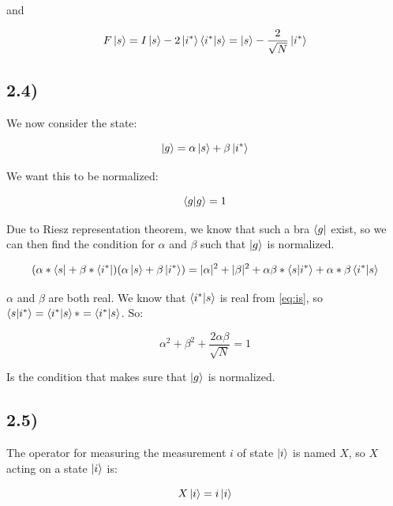 \documentclass[a4paper,norsk, 10pt]{article}
\begin{document}
and

\begin{equation}
F\ket{s} = I\ket{s} - 2\ket{i^*}\bra{i^*}\ket{s} = \ket{s} - \frac{2}{\sqrt{N}}\ket{i^*}
\end{equation}\label{eq:Fs}



\subsection{2.4)}

We now consider the state:

\begin{equation}
\ket{g} = \alpha \ket{s} + \beta\ket{i^*}
\end{equation}

We want this to be normalized:

\begin{equation}
\braket{g}{g} = 1
\end{equation}

Due to Riesz representation theorem, we know that such a bra $\bra{g}$ exist, so we can then find the condition for $\alpha$ and $\beta$ such that $\ket{g}$ is normalized.

\begin{equation}
(\alpha* \bra{s} + \beta*\bra{i^*})(\alpha \ket{s} + \beta\ket{i^*}) = |\alpha|^2 + |\beta|^2 + \alpha\beta* \braket{s}{i^*} + \alpha*\beta \braket{i^*}{s}
\end{equation}

$\alpha$ and $\beta$ are both real. We know that $\braket{i^*}{s}$ is real from \eqref{eq:is}, so $\braket{s}{i^*} = \braket{i^*}{s}* = \braket{i^*}{s}$. So: 

\begin{equation}
\alpha^2 + \beta^2 + \frac{2\alpha \beta}{\sqrt{N}} = 1
\end{equation}\label{eq:conditionAB}

Is the condition that makes sure that $\ket{g}$ is normalized.

\subsection{2.5)}

The operator for measuring the measurement $i$ of state $\ket{i}$ is named $X$, so $X$ acting on a state $\ket{i}$ is:

\begin{equation}
X\ket{i} = i\ket{i}
\end{equation}
\end{document}
